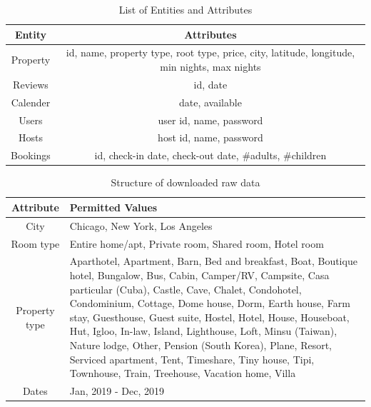 \documentclass[10pt]{article}
\begin{document}
\begin{table}[!htbp]
\begin{center}
 \begin{tabular}{||c c||} 
 \hline
 Entity & Attributes  \\ [0.5ex] 
 \hline\hline
 Property & id, name, property type, root type, price, city, latitude, longitude, min nights, max nights  \\ 
 \hline
 Reviews & id, date \\
 \hline
 Calender & date, available \\
 \hline
 Users & user id, name, password \\
 \hline
 Hosts & host id, name, password \\
  \hline
 Bookings & id, check-in date, check-out date, #adults, #children \\
 \hline
\end{tabular}
\caption {List of Entities and Attributes}
\end{center}
\end{table}
\vspace{-1cm}
\begin{table}[!htbp]
\begin{center}
 \begin{tabular}{|c |>{\centering\arraybackslash}m{40 em} |} 
 \hline
 Attribute & Permitted Values  \\ [0.5ex] 
 \hline\hline
 City & Chicago, New York, Los Angeles  \\ 
 \hline
 Room type & Entire home/apt, Private room, Shared room, Hotel room \\
 \hline
 Property type & Aparthotel, Apartment, Barn, Bed and breakfast, Boat, Boutique hotel, Bungalow, Bus, Cabin, Camper/RV, Campsite, Casa particular (Cuba), Castle, Cave, Chalet, Condohotel, Condominium, Cottage, Dome house, Dorm, Earth house, Farm stay, Guesthouse, Guest suite, Hostel, Hotel, House, Houseboat, Hut, Igloo, In-law, Island, Lighthouse, Loft, Minsu (Taiwan), Nature lodge, Other, Pension (South Korea), Plane, Resort, Serviced apartment, Tent, Timeshare, Tiny house, Tipi, Townhouse, Train, Treehouse, Vacation home, Villa \\
 \hline
 Dates & Jan, 2019 - Dec, 2019 
 \\
  \hline
\end{tabular}
\caption {Structure of downloaded raw data}
\end{center}
\end{table}

\pagebreak
\end{document}
